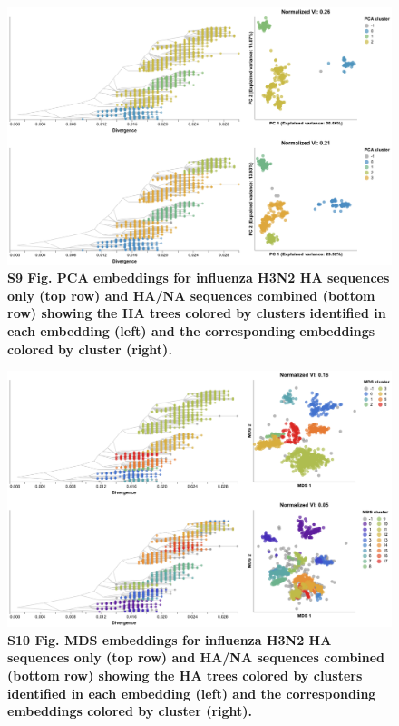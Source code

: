 \documentclass[10pt,letterpaper]{article}
\begin{document}
\begin{figure}[!h]
\includegraphics[width=\columnwidth]{figures/flu-2016-2018-ha-na-pca-by-cluster.png}
\caption*{{\bf S9 Fig. PCA embeddings for influenza H3N2 HA sequences only (top row) and HA/NA sequences combined (bottom row) showing the HA trees colored by clusters identified in each embedding (left) and the corresponding embeddings colored by cluster (right).}}
\end{figure}

\begin{figure}[!h]
\includegraphics[width=\columnwidth]{figures/flu-2016-2018-ha-na-mds-by-cluster.png}
\caption*{{\bf S10 Fig. MDS embeddings for influenza H3N2 HA sequences only (top row) and HA/NA sequences combined (bottom row) showing the HA trees colored by clusters identified in each embedding (left) and the corresponding embeddings colored by cluster (right).}}
\end{figure}
\end{document}
